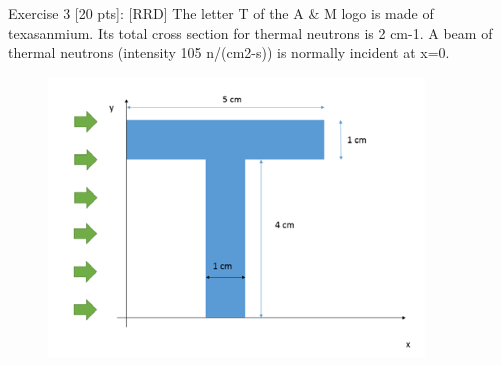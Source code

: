 \documentclass[12pt,fleqn, parskip=full]{scrartcl}
\begin{document}
Exercise 3 [20 pts]: [RRD] The letter T of the A \& M logo is made of texasanmium. Its total cross section for thermal neutrons is 2 cm-1. A beam of thermal neutrons (intensity 105 n/(cm2-s)) is normally incident at x=0. 
\begin{figure}[H]
	\centering
	\includegraphics[scale=1]{Image_2_hw_2}
\end{figure}
\end{document}
